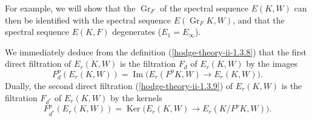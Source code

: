     For example, we will show that the \(\operatorname {Gr}_F\) of the spectral sequence \(E(K,W)\) can then be identified with the spectral sequence \(E(\operatorname {Gr}_FK,W)\), and that the spectral sequence \(E(K,F)\) degenerates (\(E_1=E_\infty \)).\label{hodge-theory-iii-7.2.4}\par{}We immediately deduce from the definition (\cref{hodge-theory-ii-1.3.8}) that the first direct filtration of \(E_r(K,W)\) is the filtration \(F_d\) of \(E_r(K,W)\) by the images
    \[       F_d^p(E_r(K,W))       = \operatorname {Im} \big (E_r(F^pK,W) \to  E_r(K,W)\big ).     \]
    Dually, the second direct filtration (\cref{hodge-theory-ii-1.3.9}) of \(E_r(K,W)\) is the filtration \(F_{d^*}\) of \(E_r(K,W)\) by the kernels
    \[       F_{d^*}^p(E_r(K,W))       = \operatorname {Ker} \big (E_r(K,W) \to  E_r(K/F^pK,W)\big ).     \]

